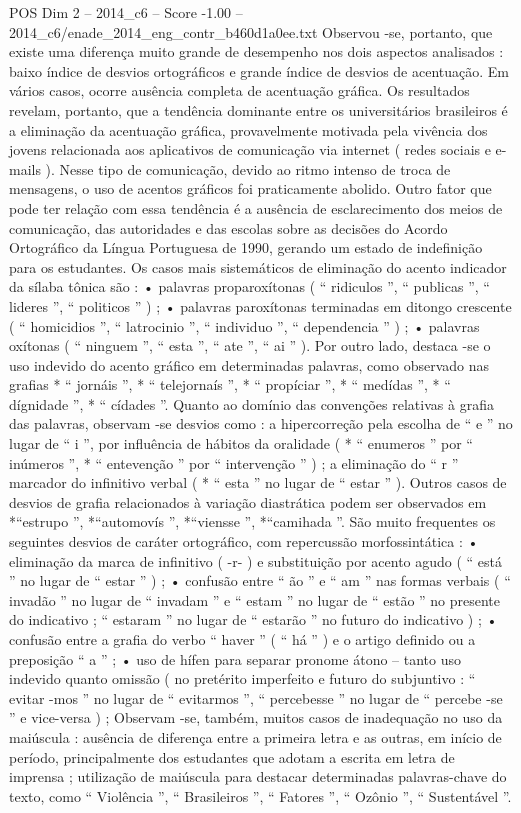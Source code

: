 \begin{textsample}{POS Dim 2 – 2014\_c6 – Score -1.00 – 2014\_c6/enade\_2014\_eng\_contr\_b460d1a0ee.txt}
Observou -se, portanto, que existe uma diferença muito grande de desempenho nos dois aspectos analisados : baixo índice de desvios ortográficos e grande índice de desvios de acentuação.
Em vários casos, ocorre ausência completa de acentuação gráfica.
Os resultados revelam, portanto, que a tendência dominante entre os universitários brasileiros é a eliminação da acentuação gráfica, provavelmente motivada pela vivência dos jovens relacionada aos aplicativos de comunicação via internet ( redes sociais e e-mails ).
Nesse tipo de comunicação, devido ao ritmo intenso de troca de mensagens, o uso de acentos gráficos foi praticamente abolido.
Outro fator que pode ter relação com essa tendência é a ausência de esclarecimento dos meios de comunicação, das autoridades e das escolas sobre as decisões do Acordo Ortográfico da Língua Portuguesa de 1990, gerando um estado de indefinição para os estudantes.
Os casos mais sistemáticos de eliminação do acento indicador da sílaba tônica são : • palavras proparoxítonas ( “ ridiculos ”, “ publicas ”, “ lideres ”, “ politicos ” ) ; • palavras paroxítonas terminadas em ditongo crescente ( “ homicidios ”, “ latrocinio ”, “ individuo ”, “ dependencia ” ) ; • palavras oxítonas ( “ ninguem ”, “ esta ”, “ ate ”, “ ai ” ).
Por outro lado, destaca -se o uso indevido do acento gráfico em determinadas palavras, como observado nas grafias * “ jornáis ”, * “ telejornaís ”, * “ propíciar ”, * “ medídas ”, * “ dígnidade ”, * “ cídades ”.
Quanto ao domínio das convenções relativas à grafia das palavras, observam -se desvios como : a hipercorreção pela escolha de “ e ” no lugar de “ i ”, por influência de hábitos da oralidade ( * “ enumeros ” por “ inúmeros ”, * “ entevenção ” por “ intervenção ” ) ; a eliminação do “ r ” marcador do infinitivo verbal ( * “ esta ” no lugar de “ estar ” ).
Outros casos de desvios de grafia relacionados à variação diastrática podem ser observados em *“estrupo ”, *“automovís ”, *“viensse ”, *“camihada ”.
São muito frequentes os seguintes desvios de caráter ortográfico, com repercussão morfossintática : • eliminação da marca de infinitivo ( -r- ) e substituição por acento agudo ( “ está ” no lugar de “ estar ” ) ; • confusão entre “ ão ” e “ am ” nas formas verbais ( “ invadão ” no lugar de “ invadam ” e “ estam ” no lugar de “ estão ” no presente do indicativo ; “ estaram ” no lugar de “ estarão ” no futuro do indicativo ) ; • confusão entre a grafia do verbo “ haver ” ( “ há ” ) e o artigo definido ou a preposição “ a ” ; • uso de hífen para separar pronome átono – tanto uso indevido quanto omissão ( no pretérito imperfeito e futuro do subjuntivo : “ evitar -mos ” no lugar de “ evitarmos ”, “ percebesse ” no lugar de “ percebe -se ” e vice-versa ) ; Observam -se, também, muitos casos de inadequação no uso da maiúscula : ausência de diferença entre a primeira letra e as outras, em início de período, principalmente dos estudantes que adotam a escrita em letra de imprensa ; utilização de maiúscula para destacar determinadas palavras-chave do texto, como “ Violência ”, “ Brasileiros ”, “ Fatores ”, “ Ozônio ”, “ Sustentável ”.

\end{textsample}
